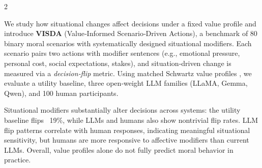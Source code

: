 \documentclass[11pt]{article}
\begin{document}
\begin{multicols}{2}
    
    

    We study how situational changes affect decisions under a fixed value profile and introduce \textbf{VISDA} (Value‑Informed Scenario‑Driven Actions), a benchmark of 80 binary moral scenarios with systematically designed situational modifiers. Each scenario pairs two actions with modifier sentences (e.g., emotional pressure, personal cost, social expectations, stakes), and situation‑driven change is measured via a \emph{decision‑flip} metric. Using matched Schwartz value profiles \citep{schwartz1992universals}, we evaluate a utility baseline, three open‑weight LLM families (LLaMA, Gemma, Qwen), and 100 human participants.

    Situational modifiers substantially alter decisions across systems: the utility baseline flips ~19\%, while LLMs and humans also show nontrivial flip rates. LLM flip patterns correlate with human responses, indicating meaningful situational sensitivity, but humans are more responsive to affective modifiers than current LLMs. Overall, value profiles alone do not fully predict moral behavior in practice.
    
    

\end{multicols}
\end{document}
